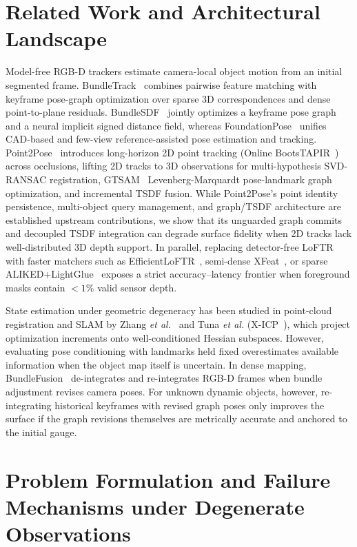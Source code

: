 \documentclass[10pt,journal]{IEEEtran}
\begin{document}
\section{Related Work and Architectural Landscape}
\label{sec:related}

Model-free RGB-D trackers estimate camera-local object motion from an initial segmented frame. BundleTrack~\cite{bundletrack} combines pairwise feature matching with keyframe pose-graph optimization over sparse 3D correspondences and dense point-to-plane residuals. BundleSDF~\cite{bundlesdf} jointly optimizes a keyframe pose graph and a neural implicit signed distance field, whereas FoundationPose~\cite{foundationpose} unifies CAD-based and few-view reference-assisted pose estimation and tracking. Point2Pose~\cite{point2pose} introduces long-horizon 2D point tracking (Online BootsTAPIR~\cite{bootstap}) across occlusions, lifting 2D tracks to 3D observations for multi-hypothesis SVD-RANSAC registration, GTSAM~\cite{gtsam} Levenberg-Marquardt pose-landmark graph optimization, and incremental TSDF fusion. While Point2Pose's point identity persistence, multi-object query management, and graph/TSDF architecture are established upstream contributions, we show that its unguarded graph commits and decoupled TSDF integration can degrade surface fidelity when 2D tracks lack well-distributed 3D depth support. In parallel, replacing detector-free LoFTR~\cite{loftr} with faster matchers such as EfficientLoFTR~\cite{eloftr}, semi-dense XFeat~\cite{xfeat}, or sparse ALIKED+LightGlue~\cite{aliked,lightglue} exposes a strict accuracy--latency frontier when foreground masks contain $<1\%$ valid sensor depth.

State estimation under geometric degeneracy has been studied in point-cloud registration and SLAM by Zhang \emph{et al.}~\cite{zhang2016degeneracy} and Tuna \emph{et al.} (X-ICP~\cite{xicp}), which project optimization increments onto well-conditioned Hessian subspaces. However, evaluating pose conditioning with landmarks held fixed overestimates available information when the object map itself is uncertain. In dense mapping, BundleFusion~\cite{bundlefusion} de-integrates and re-integrates RGB-D frames when bundle adjustment revises camera poses. For unknown dynamic objects, however, re-integrating historical keyframes with revised graph poses only improves the surface if the graph revisions themselves are metrically accurate and anchored to the initial gauge.

\section{Problem Formulation and Failure Mechanisms under Degenerate Observations}
\label{sec:problem}
\end{document}

